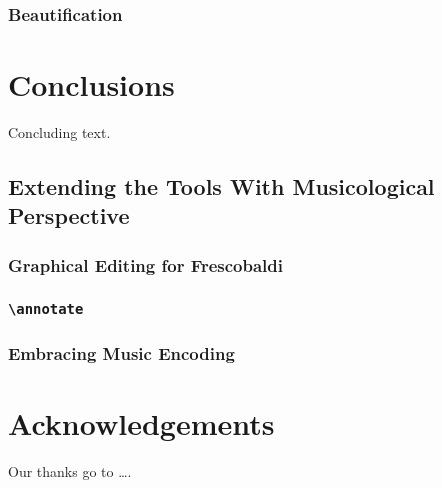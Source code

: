 \documentclass[11pt,a4paper]{article}
\begin{document}
\subsubsection{Beautification}


\section{Conclusions}\label{sec:conclusions}

Concluding text.


\subsection{Extending the Tools With Musicological Perspective}

\subsubsection{Graphical Editing for Frescobaldi}

\subsubsection{\texttt{\textbackslash annotate}}

\subsubsection{Embracing Music Encoding}



\section{Acknowledgements}

Our thanks go to \ldots .
\end{document}
